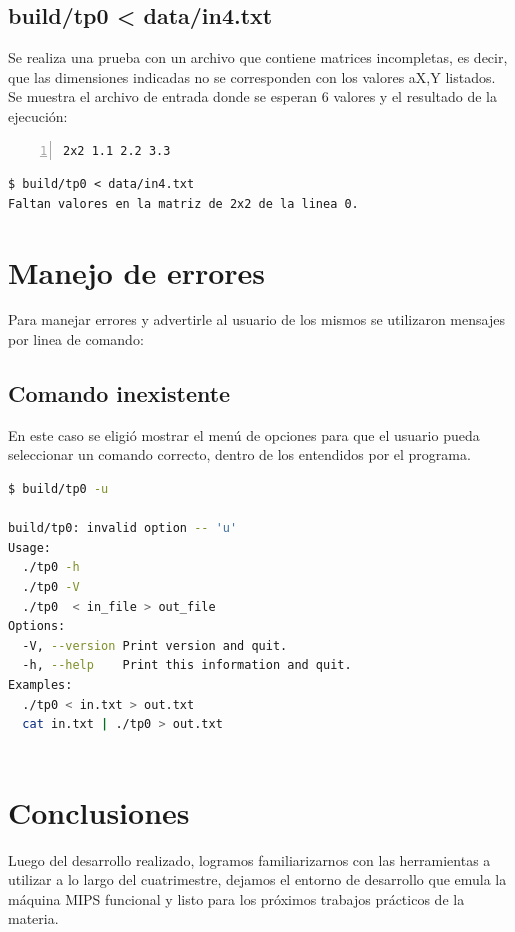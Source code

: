 \documentclass[a4paper,10pt]{article}
\begin{document}
\subsection{build/tp0 < data/in4.txt}
Se realiza una prueba con un archivo que contiene matrices incompletas, es decir, que las dimensiones indicadas no se corresponden con los valores aX,Y listados. Se muestra el archivo de entrada donde se esperan 6 valores y el resultado de la ejecuci\'on:

\begin{lstlisting}[numbers=left,language=bash]
2x2 1.1 2.2 3.3
\end{lstlisting}
\begin{lstlisting}
$ build/tp0 < data/in4.txt
Faltan valores en la matriz de 2x2 de la linea 0.
\end{lstlisting}

\newpage

\section{Manejo de errores}
Para manejar errores y advertirle al usuario de los mismos se utilizaron mensajes por linea de comando:\\

\subsection{Comando inexistente}
En este caso se eligió mostrar el menú de opciones para que el usuario pueda seleccionar un comando correcto, dentro de los entendidos por el programa.

\begin{lstlisting}[language=bash]
$ build/tp0 -u

build/tp0: invalid option -- 'u'
Usage:
  ./tp0 -h
  ./tp0 -V
  ./tp0  < in_file > out_file
Options:
  -V, --version	Print version and quit.
  -h, --help	Print this information and quit.
Examples:
  ./tp0 < in.txt > out.txt
  cat in.txt | ./tp0 > out.txt
  
\end{lstlisting}
\newpage


\section{Conclusiones}
Luego del desarrollo realizado, logramos familiarizarnos con las herramientas a utilizar a lo largo del cuatrimestre, dejamos el entorno de desarrollo que emula la m\'aquina MIPS funcional y listo para los pr\'oximos trabajos pr\'acticos de la materia.
\end{document}
